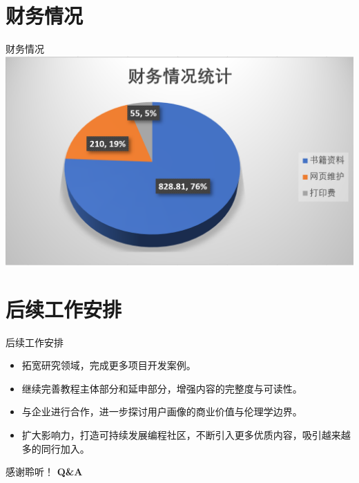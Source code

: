 \documentclass[10pt, aspectratio=32,handout]{beamer}
\begin{document}
\section{财务情况}
  \begin{frame}{财务情况}
  \includegraphics[height=0.66\paperheight]{finance}
  \end{frame}


\section{后续工作安排}
\begin{frame}{后续工作安排}
  \begin{itemize}
    \item 拓宽研究领域，完成更多项目开发案例。\newline
    \item 继续完善教程主体部分和延申部分，增强内容的完整度与可读性。\newline
    \item 与企业进行合作，进一步探讨用户画像的商业价值与伦理学边界。\newline
    \item 扩大影响力，打造可持续发展编程社区，不断引入更多优质内容，吸引越来越多的同行加入。
  \end{itemize}

\end{frame}


\begin{frame}
感谢聆听！\newline\newline
\textbf{Q\&A}
\end{frame}
\end{document}
